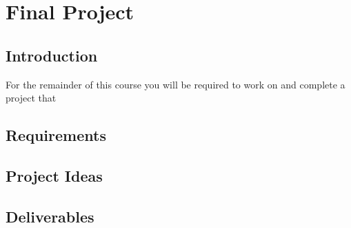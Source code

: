 \section{Final Project}

\subsection{Introduction}
For the remainder of this course you will be required to work on and complete a project that 
\subsection{Requirements}

\subsection{Project Ideas}

\subsection{Deliverables}

